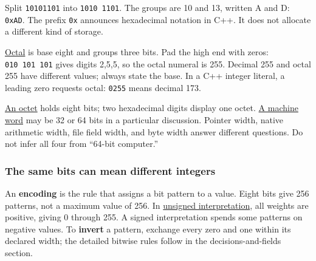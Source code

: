 Split \texttt{10101101} into \texttt{1010\ 1101}. The groups are 10 and 13, written A and D: \texttt{0xAD}. The prefix \texttt{0x} announces hexadecimal notation in C++. It does not allocate a different kind of storage.

\hyperref[appendix-17fc1bc8b305]{Octal} is base eight and groups three bits. Pad the high end with zeros: \texttt{010\ 101\ 101} gives digits 2,5,5, so the octal numeral is 255. Decimal 255 and octal 255 have different values; always state the base. In a C++ integer literal, a leading zero requests octal: \texttt{0255} means decimal 173.

\hyperref[appendix-5bee2df85484]{An octet} holds eight bits; two hexadecimal digits display one octet. \hyperref[appendix-d67a19507dc5]{A machine word} may be 32 or 64 bits in a particular discussion. Pointer width, native arithmetic width, file field width, and byte width answer different questions. Do not infer all four from ``64-bit computer.''

\subsubsection{The same bits can mean different integers}\label{01-foundations-i-ch001-the-same-bits-can-mean-different-integers}

\hypertarget{01-foundations-i-ch001-the-same-bits-can-mean-different-integers}{}

An \textbf{encoding} is the rule that assigns a bit pattern to a value. Eight bits give 256 patterns, not a maximum value of 256. In \hyperref[appendix-c99977d88b33]{unsigned interpretation}, all weights are positive, giving 0 through 255. A signed interpretation spends some patterns on negative values. To \textbf{invert} a pattern, exchange every zero and one within its declared width; the detailed bitwise rules follow in the decisions-and-fields section.

